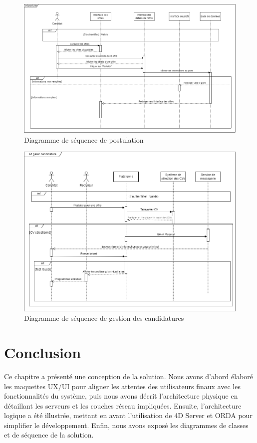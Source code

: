 \begin{figure}[htbp]
   \centering
   \includegraphics[scale=0.6]{Images/postuler.png} %
   \caption{Diagramme de séquence de postulation}
   \label{fig:seq3}
\end{figure}

\begin{figure}[htbp]
   \centering
   \includegraphics[scale=0.8]{Images/gererCandidature.png} %
   \caption{ Diagramme de séquence de gestion des candidatures}
   \label{fig:seq4}
\end{figure}


\section{Conclusion}
Ce chapitre a présenté une conception 
de la solution. Nous avons d'abord 
élaboré les maquettes UX/UI pour aligner les attentes 
des utilisateurs finaux avec les fonctionnalités 
du système, puis nous avons décrit l'architecture 
physique en détaillant les serveurs et les couches 
réseau impliquées. Ensuite, l'architecture logique 
a été illustrée, mettant en avant l'utilisation de 
4D Server et ORDA pour simplifier le développement. 
Enfin, nous avons exposé les diagrammes de classes 
et de séquence de la solution.